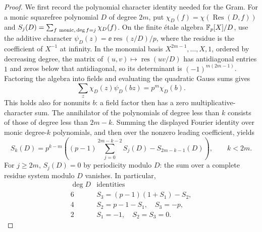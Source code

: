\begin{proof}
We first record the polynomial character identity needed for the Gram.
For a monic squarefree polynomial $D$ of degree $2m$, put
$\chi_D(f)=\chi(\operatorname{Res}(D,f))$ and
$S_j(D)=\sum_{f\ {\rm monic},\,\deg f=j}\chi_D(f)$.
On the finite \'etale algebra $\mathbb F_p[X]/D$, use the additive character
$\psi_D(z)=\ee{\operatorname{res}(z/D)/p}$, where the residue is the
coefficient of $X^{-1}$ at infinity. In the monomial basis
$X^{2m-1},\ldots,X,1$, ordered by decreasing degree, the matrix of
$(u,v)\mapsto\operatorname{res}(uv/D)$ has antidiagonal entries $1$
and zeros below that antidiagonal, so its determinant is
$(-1)^{m(2m-1)}$. Factoring the algebra into fields and evaluating
the quadratic Gauss sums gives
\[
 \sum_z\chi_D(z)\psi_D(bz)=p^m\chi_D(b).
\]
This holds also for nonunits $b$: a field factor then has a zero
multiplicative-character sum. The annihilator of the polynomials
of degree less than $k$ consists of those of degree less than
$2m-k$. Summing the displayed Fourier identity over monic degree-$k$
polynomials, and then over the nonzero leading coefficient, yields
\[
 S_k(D)=p^{k-m}\left((p-1)\sum_{j=0}^{2m-k-2}S_j(D)
                         -S_{2m-k-1}(D)\right),\qquad k<2m.
\]
For $j\ge2m$, $S_j(D)=0$ by periodicity modulo $D$: the sum over
a complete residue system modulo $D$ vanishes.
In particular,
\[
\begin{array}{c|l}
 \deg D&\text{identities}\\ \hline
 6&S_3=(p-1)(1+S_1)-S_2,\\
 4&S_2=p-1-S_1,\quad S_3=-p,\\
 2&S_1=-1,\quad S_2=S_3=0.
\end{array}
\]


\end{proof}

